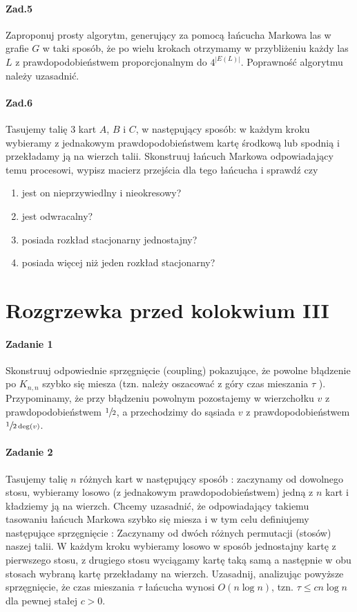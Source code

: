 \paragraph{Zad.5} Zaproponuj prosty algorytm, generujący za pomocą łańcucha Markowa las w grafie $G$ w taki sposób, że po wielu krokach otrzymamy w przybliżeniu każdy las $L$ z prawdopodobieństwem proporcjonalnym do $4^{|E(L)|}$. Poprawność algorytmu należy uzasadnić.

\paragraph{Zad.6} Tasujemy talię 3 kart $A$, $B$ i $C$, w następujący sposób: w każdym kroku wybieramy z jednakowym prawdopodobieństwem kartę środkową lub spodnią i przekładamy ją na wierzch talii. Skonstruuj łańcuch Markowa odpowiadający temu procesowi, wypisz macierz przejścia dla tego łańcucha i sprawdź czy
\begin{enumerate}[label=\alph*)]
\item jest on nieprzywiedlny i nieokresowy?
\item jest odwracalny?
\item posiada rozkład stacjonarny jednostajny?
\item posiada więcej niż jeden rozkład stacjonarny?
\end{enumerate}

\section{Rozgrzewka przed kolokwium III}
\paragraph{Zadanie 1} Skonstruuj odpowiednie sprzęgnięcie (coupling) pokazujące, że powolne błądzenie po $K_{n,n}$ szybko się miesza (tzn. należy oszacować z góry czas mieszania $\tau$ ). Przypominamy, że przy błądzeniu powolnym pozostajemy w wierzchołku $v$ z prawdopodobieństwem $\sfrac{1}{2}$, a przechodzimy do sąsiada $v$ z prawdopodobieństwem $\sfrac{1}{2\deg (v)}$.

\paragraph{Zadanie 2} Tasujemy talię $n$ różnych kart w następujący sposób : zaczynamy od dowolnego stosu, wybieramy losowo (z jednakowym prawdopodobieństwem) jedną z $n$ kart i kładziemy ją na wierzch. Chcemy uzasadnić, że odpowiadający takiemu tasowaniu łańcuch Markowa szybko się miesza i w tym celu definiujemy następujące sprzęgnięcie : Zaczynamy od dwóch różnych permutacji (stosów) naszej talii. W każdym kroku wybieramy losowo w sposób jednostajny kartę z pierwszego stosu, z drugiego stosu wyciągamy kartę taką samą a następnie w obu stosach wybraną kartę przekładamy na wierzch. Uzasadnij, analizując powyższe sprzęgnięcie, że czas mieszania $\tau$ łańcucha wynosi $O(n \log n)$, tzn. $\tau \leq cn \log n$ dla pewnej stałej $c > 0$.

